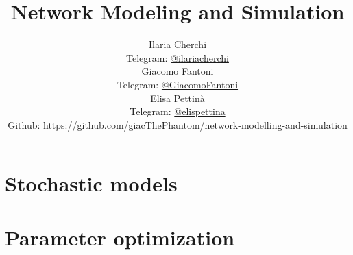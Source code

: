 
\title{\Huge\textbf{Network Modeling and Simulation}}
\author{
  Ilaria Cherchi\\
  \small Telegram: \href{https://t.me/ilariacherchi}{@ilariacherchi} \\[3pt]
  Giacomo Fantoni \\
  \small Telegram: \href{https://t.me/GiacomoFantoni}{@GiacomoFantoni} \\[3pt]
  Elisa Pettin\`a\\
  \small Telegram: \href{https://t.me/elisapettina}{@elispettina} \\[3pt]
\small Github: \href{https://github.com/giacThePhantom/network-modelling-and-simulation}{https://github.com/giacThePhantom/network-modelling-and-simulation}\\}


\maketitle
\tableofcontents

  \part{Stochastic models}
    
    
    
    
    
    
  \part{Parameter optimization}
    
    
    
    
    
    


